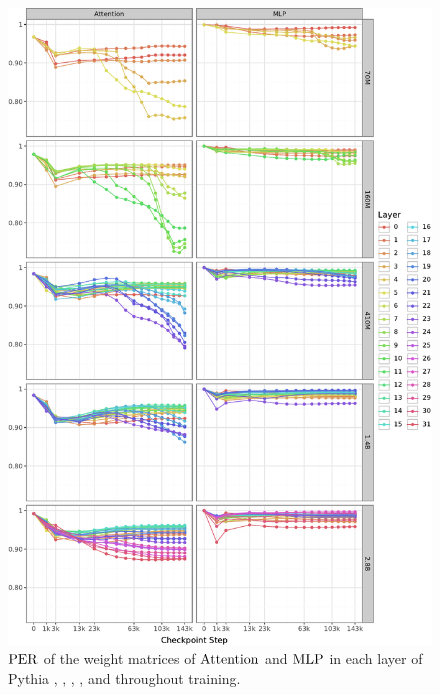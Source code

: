 \clearpage

\begin{figure}[h!]
    \centering
    \includegraphics[width=0.9\linewidth]{chapters/tending-towards-stability/figures/per_weight_lines.pdf}
    \vspace{-5pt}
    \caption{$\mathrm{PER}$ of the weight matrices of $\mathrm{Attention}$ and $\mathrm{MLP}$ in each layer of Pythia \sevenmil, \sixmil, \fourmil, \onebil, and \twobil throughout training.}%
    \label{fig:per_weight-layer-wise-lines}
\end{figure}
\clearpage

